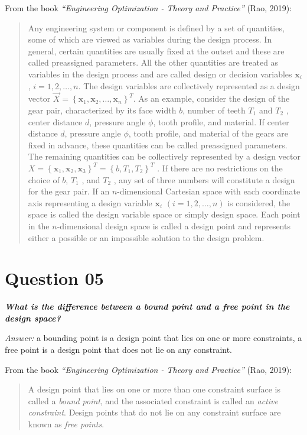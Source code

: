 \documentclass[conference]{IEEEtran}
\begin{document}
From the book \textit{``Engineering Optimization - Theory and Practice''}  (Rao, 2019):
\begin{quotation}
Any engineering system or component is defined by a set of quantities, some of which are viewed as variables during the design process. In general, certain quantities are usually fixed at the outset and these are called preassigned parameters. All the other quantities are treated as variables in the design process and are called design or decision variables $\mathbf{x}_i$ , $i = 1, 2, \hdots , n$. The design variables are collectively represented as a design vector $\vec{X} = \left\{ \mathbf{x}_{1} , \mathbf{x}_{2} , \hdots , \mathbf{x}_{n} \right\}^{T}$. As an example, consider the design of the gear pair, characterized by its face width $b$, number of teeth $T_1$ and $T_2$ , center distance $d$, pressure angle $\phi$, tooth profile, and material. If center distance $d$, pressure angle $\phi$, tooth profile, and material of the gears are fixed in advance, these quantities can be called preassigned parameters. The remaining quantities can be collectively represented by a design vector $X = \left\{ \mathbf{x}_1 , \mathbf{x}_2 , \mathbf{x}_3 \right\}^{T} = \left\{ b, T_1 , T_2 \right\}^{T}$ . If there are no restrictions on the choice of $b$, $T_1$ , and $T_2$ , any set of three numbers will constitute a design for the gear pair. If an $n$-dimensional Cartesian space with each coordinate axis representing a design variable $\mathbf{x}_i$ $(i = 1, 2, \hdots , n)$ is considered, the space is called the design variable space or simply design space. Each point in the $n$-dimensional design space is called a design point and represents either a possible or an impossible solution to the design problem.

\end{quotation}

\section{Question 05}

\textbf{\textit{What is the difference between a bound point and a free point in the design space?}}

\textit{Answer:} a bounding point is a design point that lies on one or more constraints, a free point is a design point that does not lie on any constraint.

From the book \textit{``Engineering Optimization - Theory and Practice''} (Rao, 2019):

\begin{quotation}

	A design point that lies on one or more than one constraint surface is called a \textit{bound point}, and the associated constraint is called an\textit{ active constraint}. Design points that do not lie on any constraint surface are known as \textit{free points}.

\end{quotation}
\end{document}
